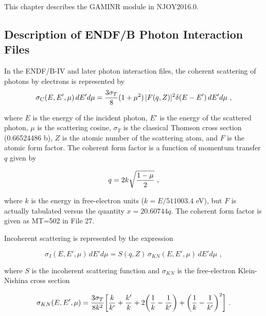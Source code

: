 This chapter describes the GAMINR module in NJOY2016.0.

\subsection{Description of ENDF/B Photon Interaction Files}
\label{ssGAMINR_Desc}

In the ENDF/B-IV and later photon interaction files, the
coherent scattering of photons by electrons is represented by
  \begin{equation}
    \sigma_C(E,E',\mu)\,dE'd\mu={{3\sigma_T} \over 8}(1+\mu^2)
    \,|F(q,Z)|^2\delta(E-E')\,dE'd\mu   \,\,,
  \label{eq1}
  \end{equation}

\noindent
where $E$ is the energy of the incident photon, $E'$ is the energy of
the scattered photon, $\mu$ is the scattering cosine, $\sigma_T$ is
the classical Thomson cross section (0.66524486 b),
$Z$ is the atomic number of the scattering atom, and $F$ is
the atomic form factor.  The coherent form factor is a function
of momentum transfer $q$ given by

  \begin{equation}
    q=2k\sqrt{{1-\mu} \over 2}   \,\,,
  \label{eq2}
  \end{equation}

\noindent
where $k$ is the energy in free-electron units ($k=E/511003.4$ eV), but $F$
is actually tabulated versus the quantity $x=20.60744q$.  The coherent
form factor is given as MT=502 in File 27.

Incoherent scattering
is represented by the expression

  \begin{equation}
    \sigma_I(E,E',\mu)\,dE'd\mu=S(q,Z)\,\sigma_{KN}(E,E',\mu)\,dE'd\mu \,\,,
  \label{eq3}
  \end{equation}
\vspace{0.5 pt}

\noindent
where $S$ is the incoherent scattering function and $\sigma_{KN}$ is the
free-electron Klein-Nishina cross section

  \begin{equation}
    \sigma_{KN}(E,E',\mu)={{3\sigma_T} \over {8k^2}}\biggl[{k \over k'} +
    {k' \over k} + 2\biggl({1 \over k}
    - {1 \over k'}\biggr) + \biggl( {1 \over k}
    - {1 \over k'} \biggr)^2 \biggr]   \,\,.
  \end{equation}
\vspace{0.5 pt}

